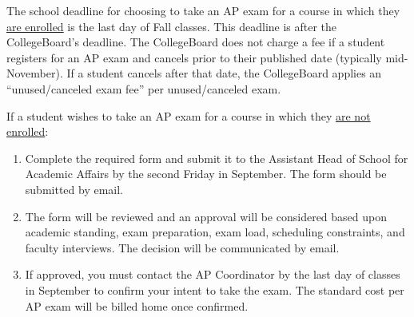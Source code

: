 \begin{enumerate}
  The school deadline  for choosing to take an  AP exam for a course in which they \underline{are enrolled} is the last day of Fall classes.  This deadline is after the CollegeBoard's deadline.  The CollegeBoard does not charge a fee if a student registers for an AP exam and cancels prior to their published date (typically mid-November).  If a student cancels after that date, the CollegeBoard applies an ``unused/canceled exam fee'' per unused/canceled exam.  
  
  If a student wishes to take an AP exam for a course in which  they \underline{are not enrolled}:
  
  \begin{enumerate}
    \item Complete the required form and submit it to the Assistant Head of School for Academic Affairs by the second Friday in September. The form should be submitted by email.
    \item The form will be reviewed and an approval will be considered based upon academic standing, exam preparation, exam load, scheduling constraints, and faculty interviews. The decision will be communicated by email.
    \item  If approved, you must contact the AP Coordinator by the last day of classes in September to confirm your intent to take the exam. The standard cost per AP exam will be billed home once confirmed. 
  \end{enumerate}






  

\end{enumerate}





